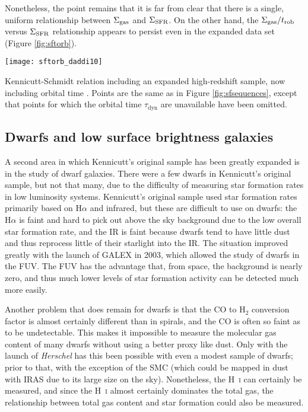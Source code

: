 Nonetheless, the point remains that it is far from clear that there is a single, uniform relationship between $\Sigma_{\rm gas}$ and $\Sigma_{\rm SFR}$. On the other hand, the $\Sigma_{\rm gas}/t_{\rm rob}$ versus $\Sigma_{\rm SFR}$ relationship appears to persist even in the expanded data set (Figure \ref{fig:sftorb}).
\begin{marginfigure}
\texttt{[image: sftorb\_daddi10]}
\caption[Kennicutt-Schmidt relation, orbital time version, with additional high-redshift data]{
\label{fig:sftorb}
Kennicutt-Schmidt relation including an expanded high-redshift sample, now including orbital time \citet{daddi10a}. Points are the same as in Figure \ref{fig:sfsequences}, except that points for which the orbital time $\tau_{\mathrm{dyn}}$ are unavailable have been omitted.
}
\end{marginfigure}

\subsection{Dwarfs and low surface brightness galaxies}

A second area in which Kennicutt's original sample has been greatly expanded is in the study of dwarf galaxies. There were a few dwarfs in Kennicutt's original sample, but not that many, due to the difficulty of measuring star formation rates in low luminosity systems. Kennicutt's original sample used star formation rates primarily based on H$\alpha$ and infrared, but these are difficult to use on dwarfs: the H$\alpha$ is faint and hard to pick out above the sky background due to the low overall star formation rate, and the IR is faint because dwarfs tend to have little dust and thus reprocess little of their starlight into the IR. The situation improved greatly with the launch of GALEX in 2003, which allowed the study of dwarfs in the FUV. The FUV has the advantage that, from space, the background is nearly zero, and thus much lower levels of star formation activity can be detected much more easily.

Another problem that does remain for dwarfs is that the CO to H$_2$ conversion factor is almost certainly different than in spirals, and the CO is often so faint as to be undetectable. This makes it impossible to measure the molecular gas content of many dwarfs without using a better proxy like dust. Only with the launch of \textit{Herschel} has this been possible with even a modest sample of dwarfs; prior to that, with the exception of the SMC (which could be mapped in dust with IRAS due to its large size on the sky). Nonetheless, the H~\textsc{i} can certainly be measured, and since the H~\textsc{i} almost certainly dominates the total gas, the relationship between total gas content and star formation could also be measured.

